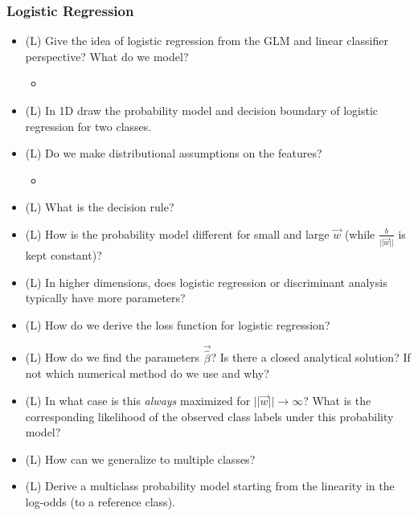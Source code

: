 \subsubsection*{Logistic Regression}
\begin{itemize}
    \item (L) Give the idea of logistic regression from the GLM and linear classifier perspective? What do we model?
    \begin{itemize}
        \item {}
    \end{itemize}
    \answerboxL
    \item (L) In 1D draw the probability model and decision boundary of logistic regression for two classes.
    \answerboxM
    \item (L) Do we make distributional assumptions on the features?
    \begin{itemize}
        \item {}
    \end{itemize}
    \answerboxM
    \item (L) What is the decision rule?
    \answerboxM
    \item (L) How is the probability model different for small and large $\vec{w}$ (while $\frac{b}{||\vec{w}||}$ is kept constant)?
    \answerboxM
    \item (L) In higher dimensions, does logistic regression or discriminant analysis typically have more parameters?
    \answerboxS
    \item (L) How do we derive the loss function for logistic regression?
    \answerboxM
    \item (L) How do we find the parameters $\vec{\hat{\beta}}$? Is there a closed analytical
    solution? If not which numerical method do we use and why?
    \answerboxS
    \item (L) In what case is this \textit{always} maximized for $||\vec{w}|| \rightarrow \infty$? What is the corresponding likelihood of the observed class labels under this probability model?
    \answerboxM
    \item (L) How can we generalize to multiple classes?
    \answerboxM
    \item (L) Derive a multiclass probability model starting from the linearity in the log-odds (to a reference class).
    \answerboxM
\end{itemize}

